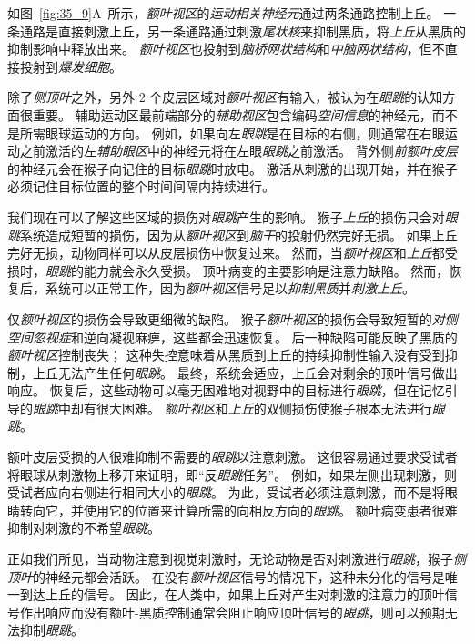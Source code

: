 如图~\ref{fig:35_9}A~所示，\textit{额叶视区}的\textit{运动相关神经元}通过两条通路控制上丘。
一条通路是直接刺激上丘，另一条通路通过刺激\textit{尾状核}来抑制黑质，将\textit{上丘}从黑质的抑制影响中释放出来。
\textit{额叶视区}也投射到\textit{脑桥网状结构}和\textit{中脑网状结构}，但不直接投射到\textit{爆发细胞}。


除了\textit{侧顶叶}之外，另外 2 个皮层区域对\textit{额叶视区}有输入，被认为在\textit{眼跳}的认知方面很重要。
辅助运动区最前端部分的\textit{辅助视区}包含编码\textit{空间信息}的神经元，而不是所需眼球运动的方向。
例如，如果向左\textit{眼跳}是在目标的右侧，则通常在右眼运动之前激活的左\textit{辅助眼区}中的神经元将在左眼\textit{眼跳}之前激活。
背外侧\textit{前额叶皮层}的神经元会在猴子向记住的目标\textit{眼跳}时放电。
激活从刺激的出现开始，并在猴子必须记住目标位置的整个时间间隔内持续进行。


我们现在可以了解这些区域的损伤对\textit{眼跳}产生的影响。
猴子\textit{上丘}的损伤只会对\textit{眼跳}系统造成短暂的损伤，因为从\textit{额叶视区}到\textit{脑干}的投射仍然完好无损。
如果上丘完好无损，动物同样可以从皮层损伤中恢复过来。
然而，当\textit{额叶视区}和\textit{上丘}都受损时，\textit{眼跳}的能力就会永久受损。
顶叶病变的主要影响是注意力缺陷。
然而，恢复后，系统可以正常工作，因为\textit{额叶视区}信号足以\textit{抑制黑质}并\textit{刺激上丘}。


仅\textit{额叶视区}的损伤会导致更细微的缺陷。
猴子\textit{额叶视区}的损伤会导致短暂的\textit{对侧空间忽视症}和逆向凝视麻痹，这些都会迅速恢复。
后一种缺陷可能反映了黑质的\textit{额叶视区}控制丧失；
这种失控意味着从黑质到上丘的持续抑制性输入没有受到抑制，上丘无法产生任何\textit{眼跳}。
最终，系统会适应，上丘会对剩余的顶叶信号做出响应。
恢复后，这些动物可以毫无困难地对视野中的目标进行\textit{眼跳}，但在记忆引导的\textit{眼跳}中却有很大困难。
\textit{额叶视区}和\textit{上丘}的双侧损伤使猴子根本无法进行\textit{眼跳}。


额叶皮层受损的人很难抑制不需要的\textit{眼跳}以注意刺激。
这很容易通过要求受试者将眼球从刺激物上移开来证明，即“反\textit{眼跳}任务”。
例如，如果左侧出现刺激，则受试者应向右侧进行相同大小的\textit{眼跳}。
为此，受试者必须注意刺激，而不是将眼睛转向它，并使用它的位置来计算所需的向相反方向的\textit{眼跳}。
额叶病变患者很难抑制对刺激的不希望\textit{眼跳}。


正如我们所见，当动物注意到视觉刺激时，无论动物是否对刺激进行\textit{眼跳}，猴子\textit{侧顶叶}的神经元都会活跃。
在没有\textit{额叶视区}信号的情况下，这种未分化的信号是唯一到达上丘的信号。
因此，在人类中，如果上丘对产生对刺激的注意力的顶叶信号作出响应而没有额叶-黑质控制通常会阻止响应顶叶信号的\textit{眼跳}，则可以预期无法抑制\textit{眼跳}。



